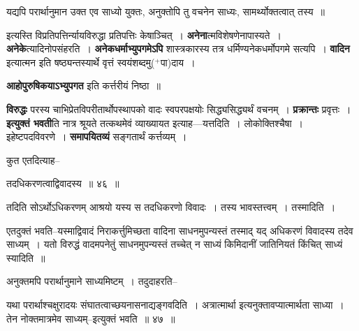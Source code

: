 \documentclass[article,12pt,a4paper]{memoir}
\newcommand{\add}[1]{($^{+}$#1)}
\begin{document}
	  \pstart यद्यपि परार्थानुमान उक्त एव साध्यो युक्तः, अनुक्तोपि तु वचनेन साध्यः, सामर्थ्योक्तत्वात् तस्य ॥
	\pend
      
	  \endgroup
	

	  \pstart इत्यस्ति विप्रतिपत्तिर्न्यायविरुद्धा प्रतिपत्तिः केषाञ्चित् । \textbf{अनेना}त्मविशेषणेनापास्यते । \textbf{अनेके}त्यादिनोपसंहरति । \textbf{अनेकधर्माभ्युपगमेऽपि} शास्त्रकारस्य तत्र धर्मिण्यनेकधर्मोपगमे सत्यपि । \textbf{वादिन} इत्यात्मन इति षष्ठ्यन्तस्यार्थे वृत्तं स्वयंशब्दमु\add{पा}दाय ।
	\pend
      

	  \pstart \textbf{आहोपुरुषिकयाऽभ्युपगत} इति कर्त्तरीयं निष्ठा ॥
	\pend
      

	  \pstart \textbf{विरुद्धः} परस्य चाभिप्रेतविपरीतार्थोपस्थापको वादः स्वपरपक्षयोः सिद्ध्यसिद्ध्यर्थं वचनम् । \textbf{प्रक्रान्तः} प्रवृत्तः । \textbf{इत्युक्तं भवती}ति नात्र श्रूयते तत्कथमेवं व्याख्यायत इत्याह—यत्तदिति । लोकोक्तिश्चैषा । इहेष्टपदविवरणे । \textbf{समापयितव्यं} सङ्गतार्थं कर्त्तव्यम् ।
	\pend
	  \bigskip
	  \begingroup
	

	  \pstart कुत एतदित्याह--
	\pend
        
	  \bigskip
	  \begingroup
	

	  \pstart तदधिकरणत्वाद्विवादस्य ॥ ४६ ॥
	\pend
      
	  \endgroup
	 

	  \pstart {}तदिति सोऽर्थोऽधिकरणम् आश्रयो यस्य स तदधिकरणो विवादः । तस्य भावस्तत्त्वम् । तस्मादिति ।
	\pend
        

	  \pstart एतदुक्तं भवति--यस्माद्विवादं निराकर्त्तुमिच्छता वादिना साधनमुपन्यस्तं तस्माद् यद् अधिकरणं विवादस्य तदेव साध्यम् । यतो विरुद्धं वादमपनेतुं साधनमुपन्यस्तं तच्चेत् न साध्यं किमिदानीं जातिनियतं किंचित् साध्यं स्यादिति ॥
	\pend
        

	  \pstart अनुक्तमपि परार्थानुमाने साध्यमिष्टम् । तदुदाहरति--
	\pend
        
	  \bigskip
	  \begingroup
	

	  \pstart यथा परार्थाश्चक्षुरादयः संघातत्वाच्छयनासनाद्यङ्गवदिति । अत्रात्मार्था इत्यनुक्तावप्यात्मार्थता साध्या । तेन नोक्तमात्रमेव साध्यम्--इत्युक्तं भवति ॥ ४७ ॥
	\pend
      
\end{document}
